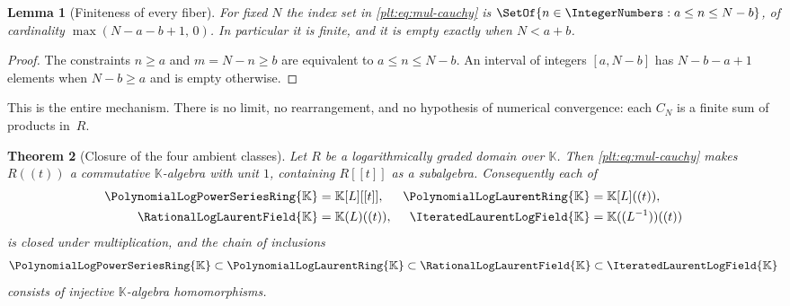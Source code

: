 \documentclass[11pt,oneside]{article}
\theoremstyle{plain}
\newtheorem{theorem}{Theorem}[section]
\newtheorem{lemma}[theorem]{Lemma}
\theoremstyle{definition}
\theoremstyle{remark}
\newcommand{\K}{\mathbb{K}}
\newcommand{\PLpow}{\PolynomialLogPowerSeriesRing{\K}}   %
\newcommand{\PLlau}{\PolynomialLogLaurentRing{\K}}       %
\newcommand{\PLrat}{\RationalLogLaurentField{\K}}        %
\newcommand{\PLit}{\IteratedLaurentLogField{\K}}         %
\begin{document}
\begin{lemma}[Finiteness of every fiber]
\label{plt:lem:mul-finite-fiber}
For fixed $N$ the index set in \eqref{plt:eq:mul-cauchy} is
$\SetOf{n\in\IntegerNumbers:a\le n\le N-b}$, of cardinality
$\max(N-a-b+1,\,0)$.  In particular it is finite, and it is empty exactly
when $N<a+b$.
\end{lemma}

\begin{proof}
The constraints $n\ge a$ and $m=N-n\ge b$ are equivalent to
$a\le n\le N-b$.  An interval of integers $[a,N-b]$ has $N-b-a+1$ elements
when $N-b\ge a$ and is empty otherwise.
\end{proof}

This is the entire mechanism.  There is no limit, no rearrangement, and no
hypothesis of numerical convergence: each $C_N$ is a finite sum of products
in~$R$.

\begin{theorem}[Closure of the four ambient classes]
\label{plt:thm:mul-closure}
Let $R$ be a logarithmically graded domain over $\K$.  Then
\eqref{plt:eq:mul-cauchy} makes $R((t))$ a commutative $\K$-algebra with unit
$1$, containing $R[[t]]$ as a subalgebra.  Consequently each of
\begin{align*}
 \PLpow&=\K[L][[t]], & \PLlau&=\K[L]((t)),\\
 \PLrat&=\K(L)((t)), & \PLit&=\K((L^{-1}))((t))
\end{align*}
is closed under multiplication, and the chain of inclusions
\begin{equation}\label{plt:eq:mul-class-chain}
 \PLpow\subset\PLlau\subset\PLrat\subset\PLit
\end{equation}
consists of injective $\K$-algebra homomorphisms.
\end{theorem}
\end{document}
